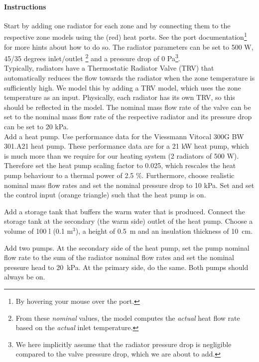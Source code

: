 \documentclass[10pt,a4paper]{article}
\begin{document}
\paragraph{Instructions}
Start by adding one radiator for each zone and by 
connecting them to the respective zone models using the (red) heat ports.
See the port documentation\footnote{By hovering your mouse over the port.} 
for more hints about how to do so.
The radiator parameters can be set to 500 W, 45/35 degrees inlet/outlet \footnote{From these \textit{nominal} values, the model computes the \textit{actual} heat flow rate based on the \textit{actual} inlet temperature.}
and a pressure drop of 0 Pa\footnote{We here implicitly assume that the radiator pressure drop is negligible compared to the valve pressure drop, which we are about to add.}.\\

Typically, radiators have a Thermostatic Radiator Valve (TRV)
that automatically reduces the flow towards the radiator
when the zone temperature is sufficiently high.
We model this by adding a TRV model, which uses
the zone temperature  as an input.
Physically, each radiator has its own TRV, 
so this should be reflected in the model.
The nominal mass flow rate of the valve can be set to the nominal
mass flow rate of the respective radiator and its pressure drop can be set 
to 20 kPa.\\

Add a heat pump. 
Use performance data for the Viessmann Vitocal 300G BW 301.A21 heat pump.
These performance data are for a 21 kW heat pump, 
which is much more than we require for our heating system (2 radiators of 500 W).
Therefore set the heat pump scaling factor to 0.025, 
which rescales the heat pump behaviour to a thermal power of 2.5 \%.
Furthermore, choose realistic nominal mass flow rates and set the nominal pressure
drop to 10 kPa. Set  and set the control input (orange triangle)
such that the heat pump is on.

Add a storage tank that buffers the warm water that is produced.
Connect the storage tank at the secondary (the warm side) outlet of the heat pump.
Choose a volume of 100 l (0.1 m$^3$), a height of 0.5~m and an insulation thickness of 10~cm.

Add two pumps.
At the secondary side of the heat pump, 
set the pump nominal flow rate to the sum of the radiator nominal flow rates
and set the nominal pressure head to 20~kPa.
At the primary side, do the same.
Both pumps should always be on.
\end{document}
